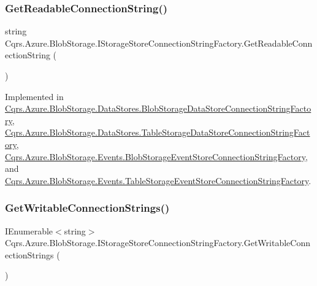 \subsubsection{\texorpdfstring{Get\+Readable\+Connection\+String()}{GetReadableConnectionString()}}
{\footnotesize\ttfamily string Cqrs.\+Azure.\+Blob\+Storage.\+I\+Storage\+Store\+Connection\+String\+Factory.\+Get\+Readable\+Connection\+String (\begin{DoxyParamCaption}{ }\end{DoxyParamCaption})}



Implemented in \hyperlink{classCqrs_1_1Azure_1_1BlobStorage_1_1DataStores_1_1BlobStorageDataStoreConnectionStringFactory_a1b5b69109d07e5612df981012d812e78}{Cqrs.\+Azure.\+Blob\+Storage.\+Data\+Stores.\+Blob\+Storage\+Data\+Store\+Connection\+String\+Factory}, \hyperlink{classCqrs_1_1Azure_1_1BlobStorage_1_1DataStores_1_1TableStorageDataStoreConnectionStringFactory_a0bdcd6f6d273a225c3ebcd6aa9386b95}{Cqrs.\+Azure.\+Blob\+Storage.\+Data\+Stores.\+Table\+Storage\+Data\+Store\+Connection\+String\+Factory}, \hyperlink{classCqrs_1_1Azure_1_1BlobStorage_1_1Events_1_1BlobStorageEventStoreConnectionStringFactory_aa47606e4cd5a71437bed71e07fda53ed}{Cqrs.\+Azure.\+Blob\+Storage.\+Events.\+Blob\+Storage\+Event\+Store\+Connection\+String\+Factory}, and \hyperlink{classCqrs_1_1Azure_1_1BlobStorage_1_1Events_1_1TableStorageEventStoreConnectionStringFactory_a047e58aa30e97231dc913df350bc2446}{Cqrs.\+Azure.\+Blob\+Storage.\+Events.\+Table\+Storage\+Event\+Store\+Connection\+String\+Factory}.

\mbox{\label{interfaceCqrs_1_1Azure_1_1BlobStorage_1_1IStorageStoreConnectionStringFactory_a26ecfd0805fe3d525e9fa419330bd140}} 
\subsubsection{\texorpdfstring{Get\+Writable\+Connection\+Strings()}{GetWritableConnectionStrings()}}
{\footnotesize\ttfamily I\+Enumerable$<$string$>$ Cqrs.\+Azure.\+Blob\+Storage.\+I\+Storage\+Store\+Connection\+String\+Factory.\+Get\+Writable\+Connection\+Strings (\begin{DoxyParamCaption}{ }\end{DoxyParamCaption})}



